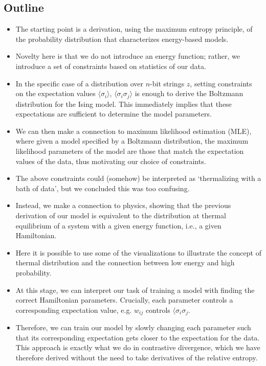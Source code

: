 \documentclass[nofootinbib, superscriptaddress, prl]{revtex4}
\begin{document}
\subsection{Outline}
\begin{itemize}
\item The starting point is a derivation, using the maximum entropy principle, of the probability distribution that characterizes energy-based models.
\item Novelty here is that we do not introduce an energy function; rather, we introduce a set of constraints based on statistics of our data. 
\item In the specific case of a distribution over $n$-bit strings $z$, setting constraints on the expectation values $\langle \sigma_i \rangle$, $\langle \sigma_i \sigma_j\rangle$ is enough to derive the Boltzmann distribution for the Ising model. This immediately implies that these expectations are sufficient to determine the model parameters.
\item We can then make a connection to maximum likelihood estimation (MLE), where given a model specified by a Boltzmann distribution, the maximum likelihood parameters of the model are those that match the expectation values of the data, thus motivating our choice of constraints.
\item The above constraints could (somehow) be interpreted as `thermalizing with a bath of data', but we concluded this was too confusing.
\item Instead, we make a connection to physics, showing that the previous derivation of our model is equivalent to the distribution at thermal equilibrium of a system with a given energy function, i.e., a given Hamiltonian.
\item Here it is possible to use some of the visualizations to illustrate the concept of thermal distribution and the connection between low energy and high probability.
\item At this stage, we can interpret our task of training a model with finding the correct Hamiltonian parameters. Crucially, each parameter controls a corresponding expectation value, e.g. $w_{ij}$ controls $\langle \sigma_i \sigma_j$.
\item Therefore, we can train our model by slowly changing each parameter such that its corresponding expectation gets closer to the expectation for the data. This approach is exactly what we do in contrastive divergence, which we have therefore derived without the need to take derivatives of the relative entropy.

\end{itemize}
\end{document}
